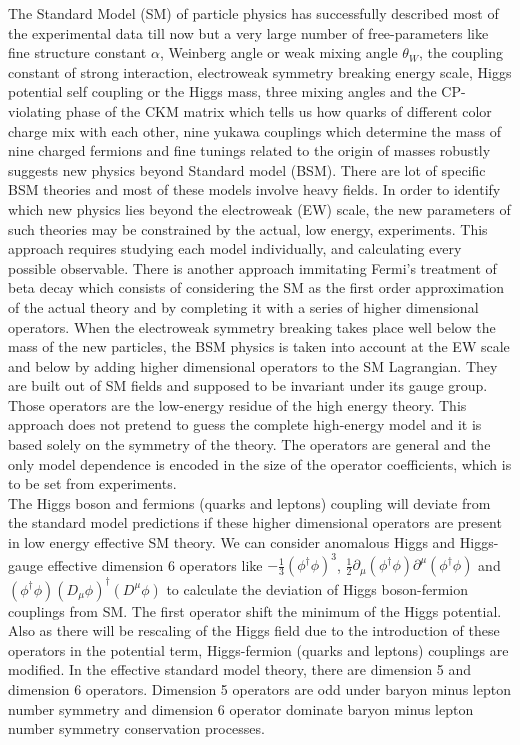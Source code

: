 \documentclass[final,3p]{CSP}
\begin{document}
The Standard Model (SM) of particle physics has successfully described most of the experimental data till now but a very large 
number of free-parameters like fine structure constant $\alpha$, Weinberg angle or weak mixing angle $\theta_W$, the coupling 
constant of strong interaction, electroweak symmetry breaking energy scale, Higgs potential self coupling or the Higgs mass, 
three mixing angles and the CP-violating phase of the CKM matrix which tells us how quarks of 
different color charge mix with 
each other, nine yukawa couplings which determine the mass of nine charged fermions and fine 
tunings related to the origin of 
masses robustly suggests new physics beyond Standard model (BSM). There are lot of specific 
BSM theories and most of these 
models involve heavy fields. In order to identify which new physics lies beyond the 
electroweak (EW) scale, the new parameters 
of such theories may be constrained by the actual, low energy, experiments. This approach 
requires studying each model 
individually, and calculating every possible observable. There is another approach immitating 
Fermi's treatment of beta decay 
which consists of considering the SM as the first order approximation of the actual theory 
and by completing it with a series 
of higher dimensional operators. When the electroweak symmetry breaking takes place well 
below the mass of the new particles, 
the BSM physics is taken into account at the EW scale and below by adding higher dimensional 
operators to the SM Lagrangian. 
They are built out of SM fields and supposed to be invariant under its gauge group. Those 
operators are the low-energy residue 
of the high energy theory. This approach does not pretend to guess the complete high-energy 
model and it is based solely on 
the symmetry of the  theory. The operators are general and the only model dependence is 
encoded in the size of the operator 
coefficients, which is to be set from experiments.\\

The Higgs boson and fermions (quarks and leptons) coupling will deviate from the standard 
model predictions if these higher 
dimensional operators are present in low energy effective SM theory. We can consider 
anomalous Higgs and Higgs-gauge effective 
dimension 6 operators like $-\frac{1}{3}(\phi^{\dagger}\phi)^3$, $\frac{1}{2} \partial_{\mu} 
(\phi^{\dagger} \phi) 
\partial^{\mu}(\phi^{\dagger} \phi)$ and $(\phi^{\dagger} \phi)(D_{\mu} \phi)^{\dagger} 
(D^{\mu} \phi)$ to calculate the 
deviation of Higgs boson-fermion couplings from SM. The first operator shift the minimum of 
the Higgs potential. Also as there 
will be rescaling of the Higgs field due to the introduction of these operators in the 
potential term, Higgs-fermion (quarks 
and leptons) couplings are modified. In the effective standard model theory, there are 
dimension 5 and dimension 6 
operators. Dimension 5 operators are odd under baryon minus lepton number symmetry and 
dimension 6 operator dominate baryon 
minus lepton number symmetry conservation processes.\\
\end{document}
